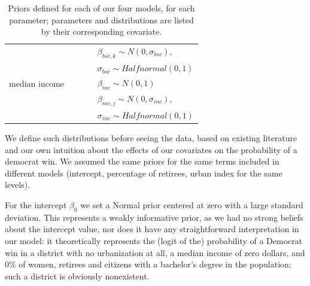 \documentclass[12pt]{article}
\begin{document}
\begin{table}[h]
{\begin{tabular}{l|llll}
			              &                                          &                                          &                                              & $\beta_{bsc, k} \sim N(0, \sigma_{bsc}), $ \\
			              &                                          &                                          &                                              & $\sigma_{bsc} \sim Halfnormal(0,1)$        \\
			median income &                                          &                                          &                                              & $\beta_{inc} \sim N(0,1)$                    \\
			              &                                          &                                          &                                              & $\beta_{inc, j} \sim N(0, \sigma_{inc}), $ \\
			              &                                          &                                          &                                              & $\sigma_{inc} \sim Halfnormal(0,1)$        \\ \bottomrule
		\end{tabular}%
	}
	\caption{Priors defined for each of our four models, for each parameter; parameters and distributions are listed by their corresponding covariate.}
	\label{tab:priors}
\end{table}



We define such distributions before seeing the data, based on existing literature and our own intuition about the effects of our covariates on the probability of a democrat win.
We assumed the same priors for the same terms included in different models (intercept, percentage of retirees, urban index for the same levels).


For the intercept $\beta_0$ we set a Normal prior centered at zero with a large standard deviation. 
This represents a weakly informative prior, as we had no strong beliefs about the intercept value, nor does it have any straightforward interpretation in our model: it theoretically represents the (logit of the) probability of a Democrat win in a district with no urbanization at all, a median income of zero dollars, and 0\% of women, retirees and citizens with a bachelor's degree in the population; such a district is obviously nonexistent.
\end{document}

